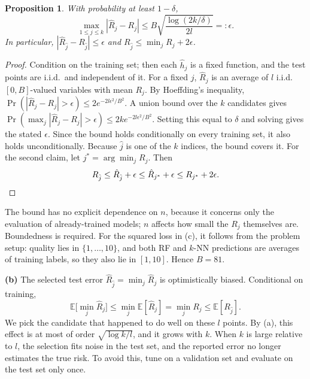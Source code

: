 \documentclass[11pt]{article}
\newtheorem*{prop}{Proposition}
\begin{document}
\begin{prop}
With probability at least $1-\delta$,
\[
\max_{1\le j\le k}|\hat R_j-R_j|\le B\sqrt{\frac{\log(2k/\delta)}{2l}}=:\epsilon .
\]
In particular, $|\hat R_{\hat j}-R_{\hat j}|\le\epsilon$ and $R_{\hat j}\le\min_jR_j+2\epsilon$.
\end{prop}
\begin{proof}
Condition on the training set; then each $\hat h_j$ is a fixed function, and the test points are i.i.d.\ and independent of it. For a fixed $j$, $\hat R_j$ is an average of $l$ i.i.d.\ $[0,B]$-valued variables with mean $R_j$. By Hoeffding's inequality, $\Pr(|\hat R_j-R_j|>\epsilon)\le2e^{-2l\epsilon^2/B^2}$. A union bound over the $k$ candidates gives $\Pr(\max_j|\hat R_j-R_j|>\epsilon)\le2ke^{-2l\epsilon^2/B^2}$. Setting this equal to $\delta$ and solving gives the stated $\epsilon$. Since the bound holds conditionally on every training set, it also holds unconditionally. Because $\hat j$ is one of the $k$ indices, the bound covers it. For the second claim, let $j^*=\arg\min_jR_j$. Then
\[
R_{\hat j}\le\hat R_{\hat j}+\epsilon\le\hat R_{j^*}+\epsilon\le R_{j^*}+2\epsilon. \qedhere
\]
\end{proof}
The bound has no explicit dependence on $n$, because it concerns only the evaluation of already-trained models; $n$ affects how small the $R_j$ themselves are. Boundedness is required. For the squared loss in (c), it follows from the problem setup: quality lies in $\{1,\dots,10\}$, and both RF and $k$-NN predictions are averages of training labels, so they also lie in $[1,10]$. Hence $B=81$.

\textbf{(b)} The selected test error $\hat R_{\hat j}=\min_j\hat R_j$ is optimistically biased. Conditional on training,
\[
\mathbb E\big[\min_j\hat R_j\big]\le\min_j\mathbb E[\hat R_j]=\min_jR_j\le\mathbb E[R_{\hat j}].
\]
We pick the candidate that happened to do well on these $l$ points. By (a), this effect is at most of order $\sqrt{\log k/l}$, and it grows with $k$. When $k$ is large relative to $l$, the selection fits noise in the test set, and the reported error no longer estimates the true risk. To avoid this, tune on a validation set and evaluate on the test set only once.
\end{document}
